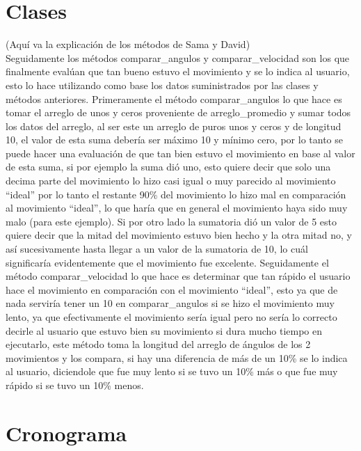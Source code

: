 \documentclass[letterpaper]{article}
\begin{document}
\section{Clases}


(Aquí va la explicación de los métodos de Sama y David)\\

Seguidamente los métodos comparar\_angulos y comparar\_velocidad son los que finalmente evalúan que tan bueno estuvo el movimiento y se lo indica al usuario, esto lo hace utilizando como base los datos suministrados por las clases y métodos anteriores. Primeramente el método comparar\_angulos lo que hace es tomar el arreglo de unos y ceros proveniente de arreglo\_promedio y sumar todos los datos del arreglo, al ser este un arreglo de puros unos y ceros y de longitud 10, el valor de esta suma debería ser máximo 10 y mínimo cero, por lo tanto se puede hacer una evaluación de que tan bien estuvo el movimiento en base al valor de esta suma, si por ejemplo la suma dió uno, esto quiere decir que solo una decima parte del movimiento lo hizo casi igual o muy parecido al movimiento ``ideal'' por lo tanto el restante 90\% del movimiento lo hizo mal en comparación al movimiento ``ideal'', lo que haría que en general el movimiento haya sido muy malo (para este ejemplo). Si por otro lado la sumatoria dió un valor de 5 esto quiere decir que la mitad del movimiento estuvo bien hecho y la otra mitad no, y así sucesivamente hasta llegar a un valor de la sumatoria de 10, lo cuál significaría evidentemente que el movimiento fue excelente. Seguidamente el método comparar\_velocidad lo que hace es determinar que tan rápido el usuario hace el movimiento en comparación con el movimiento ``ideal'', esto ya que de nada serviría tener un 10 en comparar\_angulos si se hizo el movimiento muy lento, ya que efectivamente el movimiento sería igual pero no sería lo correcto decirle al usuario que estuvo bien su movimiento si dura mucho tiempo en ejecutarlo, este método toma la longitud del arreglo de ángulos de los 2 movimientos y los compara, si hay una diferencia de más de un 10\% se lo indica al usuario, diciendole que fue muy lento si se tuvo un 10\% más o que fue muy rápido si se tuvo un 10\% menos. \\


\section{Cronograma}
\end{document}
